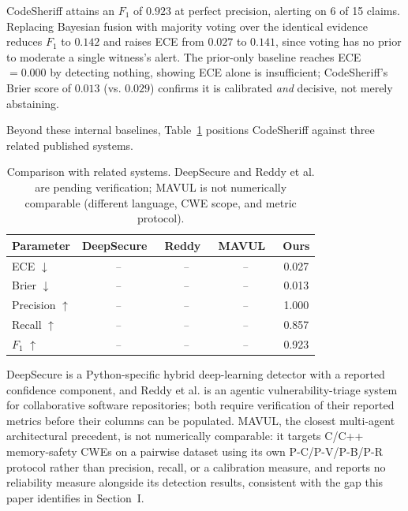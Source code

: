 \documentclass[conference]{IEEEtran}
\newcommand{\missing}[1]{\textit{#1}}
\begin{document}
CodeSheriff attains an $F_1$ of $0.923$ at perfect precision, alerting on 6
of 15 claims. Replacing Bayesian fusion with majority voting over the
identical evidence reduces $F_1$ to $0.142$ and raises ECE from $0.027$ to
$0.141$, since voting has no prior to moderate a single witness's alert. The
prior-only baseline reaches ECE $=0.000$ by detecting nothing, showing ECE
alone is insufficient; CodeSheriff's Brier score of $0.013$ (vs. $0.029$)
confirms it is calibrated \emph{and} decisive, not merely abstaining.

Beyond these internal baselines, Table~\ref{tab:related} positions
CodeSheriff against three related published systems.

\begin{table}[t]
\centering
\caption{Comparison with related systems. DeepSecure and Reddy et al. are
pending verification; MAVUL is not numerically comparable (different
language, CWE scope, and metric protocol).}
\label{tab:related}
\small
\setlength{\tabcolsep}{4pt}
\begin{tabular}{lcccc}
\toprule
Parameter & DeepSecure~\cite{ref2} & Reddy~\cite{ref6} & MAVUL~\cite{ref16} & Ours \\
\midrule
ECE $\downarrow$      & \missing{--} & \missing{--} & \missing{--} & 0.027 \\
Brier $\downarrow$    & \missing{--} & \missing{--} & \missing{--} & 0.013 \\
Precision $\uparrow$  & \missing{--} & \missing{--} & \missing{--} & 1.000 \\
Recall $\uparrow$     & \missing{--} & \missing{--} & \missing{--} & 0.857 \\
$F_1$ $\uparrow$       & \missing{--} & \missing{--} & \missing{--} & 0.923 \\
\bottomrule
\end{tabular}
\end{table}

DeepSecure is a Python-specific hybrid deep-learning detector with a
reported confidence component, and Reddy et al. is an agentic
vulnerability-triage system for collaborative software repositories; both
require verification of their reported metrics before their columns can be
populated. MAVUL, the closest multi-agent architectural precedent, is not
numerically comparable: it targets C/C++ memory-safety CWEs on a pairwise
dataset using its own P-C/P-V/P-B/P-R protocol rather than precision,
recall, or a calibration measure, and reports no reliability measure
alongside its detection results, consistent with the gap this paper
identifies in Section~I.
\end{document}

